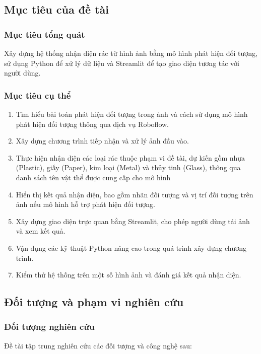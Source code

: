 \documentclass[a4paper,13pt]{extarticle}
\begin{document}
\subsection{Mục tiêu của đề tài}

\subsubsection{Mục tiêu tổng quát}
Xây dựng hệ thống nhận diện rác từ hình ảnh bằng mô hình phát hiện đối tượng, sử dụng Python để xử lý dữ liệu và Streamlit để tạo giao diện tương tác với người dùng.

\subsubsection{Mục tiêu cụ thể}
    \begin{enumerate}
        \item Tìm hiểu bài toán phát hiện đối tượng trong ảnh và cách sử dụng mô hình phát hiện đối tượng thông qua dịch vụ Roboflow.
        \item    Xây dựng chương trình tiếp nhận và xử lý ảnh đầu vào.
        \item  Thực hiện nhận diện các loại rác thuộc phạm vi đề tài, dự kiến gồm nhựa (Plastic), giấy (Paper), kim loại (Metal) và thủy tinh (Glass), thông qua danh sách tên vật thể được cung cấp cho mô hình
        \item  Hiển thị kết quả nhận diện, bao gồm nhãn đối tượng và vị trí đối tượng trên ảnh nếu mô hình hỗ trợ phát hiện đối tượng.
        \item  Xây dựng giao diện trực quan bằng Streamlit, cho phép người dùng tải ảnh và xem kết quả.
        \item  Vận dụng các kỹ thuật Python nâng cao trong quá trình xây dựng chương trình.
        \item Kiểm thử hệ thống trên một số hình ảnh và đánh giá kết quả nhận diện.
    \end{enumerate}

\subsection{Đối tượng và phạm vi nghiên cứu}

\subsubsection{Đối tượng nghiên cứu}
Đề tài tập trung nghiên cứu các đối tượng và công nghệ sau:
\end{document}
